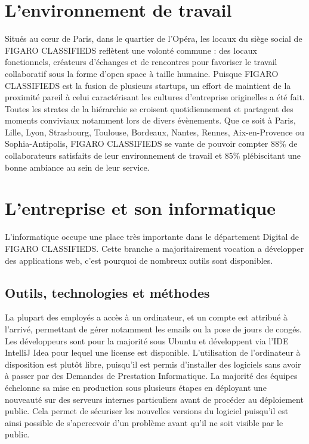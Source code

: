 \section{L'environnement de travail}
Situés au cœur de Paris, dans le quartier de l’Opéra, les locaux du siège social de FIGARO CLASSIFIEDS reflètent une volonté commune : des locaux fonctionnels, créateurs d’échanges et de rencontres pour favoriser le travail collaboratif sous la forme d'open space à taille humaine.
Puisque FIGARO CLASSIFIEDS est la fusion de plusieurs startups, un effort de maintient de la proximité pareil à celui caractérisant les cultures d'entreprise originelles a été fait.
Toutes les strates de la hiérarchie se croisent quotidiennement et partagent des moments conviviaux notamment lors de divers évènements.
Que ce soit à Paris, Lille, Lyon, Strasbourg, Toulouse, Bordeaux, Nantes, Rennes, Aix-en-Provence ou Sophia-Antipolis, FIGARO CLASSIFIEDS se vante de pouvoir compter 88\% de collaborateurs satisfaits de leur environnement de travail et 85\% plébiscitant une bonne ambiance au sein de leur service.

\section{L'entreprise et son informatique}
L'informatique occupe une place très importante dans le département Digital de FIGARO CLASSIFIEDS.
Cette branche a majoritairement vocation a développer des applications web, c'est pourquoi de nombreux outils sont disponibles.

\subsection{Outils, technologies et méthodes}
\label{subs:Outils, technologies et methodes}
La plupart des employés a accès à un ordinateur, et un compte est attribué à l'arrivé, permettant de gérer notamment les emails ou la pose de jours de congés.
Les développeurs sont pour la majorité sous Ubuntu et développent via l'IDE IntelliJ Idea pour lequel une license est disponible.
L'utilisation de l'ordinateur à disposition est plutôt libre, puisqu'il est permis d'installer des logiciels sans avoir à passer par des Demandes de Prestation Informatique.
La majorité des équipes échelonne sa mise en production sous plusieurs étapes en déployant une nouveauté sur des serveurs internes particuliers avant de procéder au déploiement public.
Cela permet de sécuriser les nouvelles versions du logiciel puisqu'il est ainsi possible de s'apercevoir d'un problème avant qu'il ne soit visible par le public.

